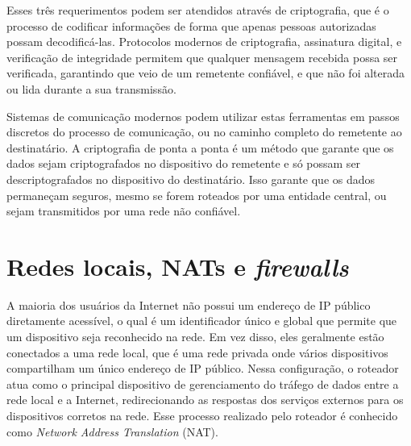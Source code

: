


Esses três requerimentos podem ser atendidos através de criptografia, que é o processo de codificar informações de forma que apenas pessoas autorizadas possam decodificá-las. Protocolos modernos de criptografia, assinatura digital, e verificação de integridade permitem que qualquer mensagem recebida possa ser verificada, garantindo que veio de um remetente confiável, e que não foi alterada ou lida durante a sua transmissão.

Sistemas de comunicação modernos podem utilizar estas ferramentas em passos discretos do processo de comunicação, ou no caminho completo do remetente ao destinatário. A criptografia de ponta a ponta é um método que garante que os dados sejam criptografados no dispositivo do remetente e só possam ser descriptografados no dispositivo do destinatário. Isso garante que os dados permaneçam seguros, mesmo se forem roteados por uma entidade central, ou sejam transmitidos por uma rede não confiável.

\section {Redes locais, NATs e \textit{firewalls}}

A maioria dos usuários da Internet não possui um endereço de IP público diretamente acessível, o qual é um identificador único e global que permite que um dispositivo seja reconhecido na rede. Em vez disso, eles geralmente estão conectados a uma rede local, que é uma rede privada onde vários dispositivos compartilham um único endereço de IP público. Nessa configuração, o roteador atua como o principal dispositivo de gerenciamento do tráfego de dados entre a rede local e a Internet, redirecionando as respostas dos serviços externos para os dispositivos corretos na rede. Esse processo realizado pelo roteador é conhecido como \textit{Network Address Translation} (NAT).

